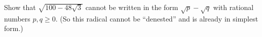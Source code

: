 Show that $\sqrt{100-48\sqrt3}$ cannot be written in the form $\sqrt p-\sqrt q$ with rational numbers $p,q\ge0$. (So this radical cannot be ``denested'' and is already in simplest form.)
